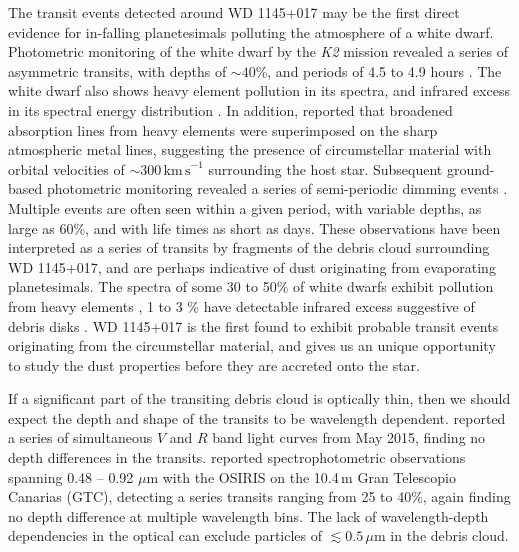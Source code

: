 \documentclass[iop,useAMES,usenatbig]{emulateapj}
\begin{document}
The transit events detected around WD 1145+017 may be the first direct evidence for in-falling planetesimals polluting the atmosphere of a white dwarf. Photometric monitoring of the white dwarf by the \emph{K2} mission revealed a series of asymmetric transits, with depths of $\sim 40$\%, and periods of 4.5 to 4.9 hours \citep{2015Natur.526..546V}. The white dwarf also shows heavy element pollution in its spectra, and infrared excess in its spectral energy distribution \citep{2015Natur.526..546V,2016ApJ...816L..22X}. In addition, \citet{2016ApJ...816L..22X} reported that broadened absorption lines from heavy elements were superimposed on the sharp atmospheric metal lines, suggesting the presence of circumstellar material with orbital velocities of $\sim 300\,\mathrm{km\,s}^{-1}$ surrounding the host star. Subsequent ground-based photometric monitoring revealed a series of semi-periodic dimming events \citep{2015Natur.526..546V,2015arXiv151006434C,2016ApJ...818L...7G,2016MNRAS.tmp..406R,2016arXiv160308823A}. Multiple events are often seen within a given period, with variable depths, as large as 60\%, and with life times as short as days. These observations have been interpreted as a series of transits by fragments of the debris cloud surrounding WD 1145+017, and are perhaps indicative of dust originating from evaporating planetesimals. The spectra of some 30 to 50\% of white dwarfs exhibit pollution from heavy elements \citep[e.g.][]{2003ApJ...596..477Z,2010ApJ...722..725Z,2014A&A...566A..34K}, 1 to 3 \% have detectable infrared excess suggestive of debris disks \citep[e.g.][]{2007ApJS..171..206M,2009ApJ...694..805F,2011MNRAS.417.1210G,2011ApJS..197...38D}. WD 1145+017 is the first found to exhibit probable transit events originating from the circumstellar material, and gives us an unique opportunity to study the dust properties before they are accreted onto the star. 

If a significant part of the transiting debris cloud is optically thin, then we should expect the depth and shape of the transits to be wavelength dependent. \citet{2015arXiv151006434C} reported a series of simultaneous $V$ and $R$ band light curves from May 2015, finding no depth differences in the transits. \citet{2016arXiv160308823A} reported spectrophotometric observations spanning 0.48 -- 0.92 $\mu$m with the OSIRIS on the 10.4\,m Gran Telescopio Canarias (GTC), detecting a series transits ranging from 25 to 40\%, again finding no depth difference at multiple wavelength bins. The lack of wavelength-depth dependencies in the optical can exclude particles of $\lesssim 0.5\,\mu \mathrm{m}$ in the debris cloud. 
\end{document}
